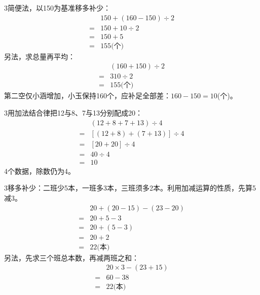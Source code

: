 \documentclass[multi=snippet,border={5bp 20bp 5bp 5bp}]{standalone}
\newenvironment{snippet}[3]{\begin{minipage}{#1bp}\color{answerred}\fontsize{#2}{#3}\selectfont\raggedright}{\end{minipage}}
\begin{document}
\begin{snippet}{505}{11.5}{14}\begin{multicols}{3}\raggedcolumns 简便法，以150为基准移多补少：\[\begin{aligned}&150+(160-150)\div2\\={}&150+10\div2\\={}&150+5\\={}&155\text{(个)}\end{aligned}\]另法，求总量再平均：\[\begin{aligned}&(160+150)\div2\\={}&310\div2\\={}&155\text{(个)}\end{aligned}\]第二空仅小涵增加，小玉保持160个，应补足全部差：\(160-150=10\)\allowbreak (个)。\end{multicols}\end{snippet}
\begin{snippet}{505}{11.5}{14}\begin{multicols}{3}\raggedcolumns 用加法结合律把12与8、7与13分别配成20：\[\begin{aligned}&(12+8+7+13)\div4\\={}&[(12+8)+(7+13)]\div4\\={}&[20+20]\div4\\={}&40\div4\\={}&10\end{aligned}\]4个数据，除数仍为4。\end{multicols}\end{snippet}
\begin{snippet}{505}{11.5}{14}\begin{multicols}{3}\raggedcolumns 移多补少：二班少5本，一班多3本，三班须多2本。利用加减运算的性质，先算5减3。\[\begin{aligned}&20+(20-15)-(23-20)\\={}&20+5-3\\={}&20+(5-3)\\={}&20+2\\={}&22\text{(本)}\end{aligned}\]另法，先求三个班总本数，再减两班之和：\[\begin{aligned}&20\times3-(23+15)\\={}&60-38\\={}&22\text{(本)}\end{aligned}\]\end{multicols}\end{snippet}
\end{document}
